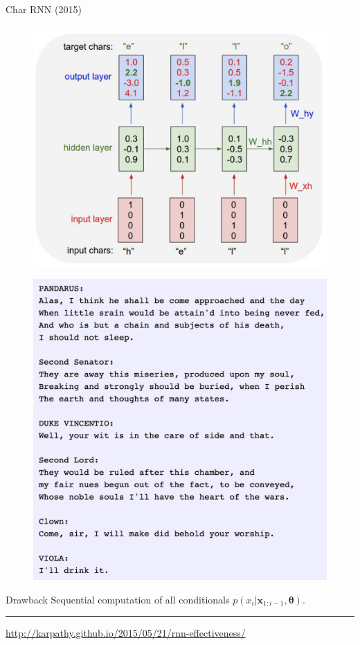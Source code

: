 \documentclass{beamer}
\newcommand{\bx}{\mathbf{x}}
\newcommand{\btheta}{\boldsymbol{\theta}}
\begin{document}
\begin{frame}{Char RNN (2015)}
	\begin{minipage}[t]{0.55\columnwidth}
		\begin{figure}[h]
			\centering
			\includegraphics[width=1.0\linewidth]{figs/char_rnn.png}
		\end{figure}
	\end{minipage}%
	\begin{minipage}[t]{0.44\columnwidth}
		\begin{figure}[h]
			\centering
			\includegraphics[width=1.0\linewidth]{figs/char_rnn_output.png}
		\end{figure}
	\end{minipage}
	\begin{block}{Drawback}
	Sequential computation of all conditionals $p(x_i | \bx_{1:i-1}, \btheta)$.
	\end{block}
\hrule\medskip
{\scriptsize  \href{http://karpathy.github.io/2015/05/21/rnn-effectiveness/}{http://karpathy.github.io/2015/05/21/rnn-effectiveness/}}
\end{frame}
\end{document}
